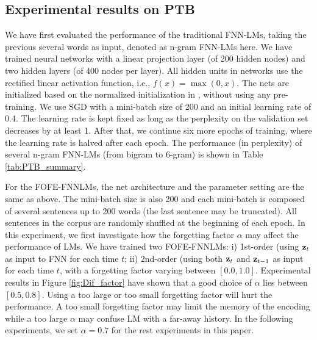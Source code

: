 \documentclass[11pt]{article}
\begin{document}
\subsection{Experimental results on PTB }

We have first evaluated the performance of the traditional FNN-LMs, taking the previous several words as input, denoted as n-gram FNN-LMs here. We have trained neural networks with a linear projection layer (of 200 hidden nodes) and two hidden layers (of 400 nodes per layer). All hidden units in networks use the rectified linear activation function, i.e., $f(x)=\max(0,x)$. The nets are initialized based on the normalized initialization in \cite{Glorot2010}, without using any pre-training.  
We use SGD with a mini-batch size of 200 and an initial learning rate of 0.4. The learning rate is kept fixed as long as the perplexity on the validation set decreases by at least 1. After that, we continue six more epochs of training, where the learning rate is halved after each epoch. The performance (in perplexity) of several n-gram FNN-LMs (from bigram to 6-gram) is shown in Table \ref{tab:PTB_summary}. 

For the FOFE-FNNLMs, the net architecture and the parameter setting are the same as above. The mini-batch size is also 200 and each mini-batch is composed of several sentences up to 200 words (the last sentence may be truncated). All sentences in the corpus are randomly shuffled at the beginning of each epoch.  In this experiment, we first investigate how the forgetting factor $\alpha$ may affect the performance of LMs. We have trained two FOFE-FNNLMs: i) 1st-order (using ${\bf z}_t$ as input to FNN for each time $t$; ii) 2nd-order (using both ${\bf z}_t$ and ${\bf z}_{t-1}$ as input for each time $t$, with a forgetting factor varying between $[0.0,1.0]$. Experimental results in Figure \ref{fig:Dif_factor} have shown that
a good choice of $\alpha$ lies between $[0.5,0.8]$. 
Using a too large or too small forgetting factor will hurt the performance. A too small forgetting factor may limit the memory of the encoding while a too large $\alpha$ may confuse LM with a far-away history. 
In the following experiments, we set $\alpha=0.7$ for the rest experiments in this paper.
\end{document}
